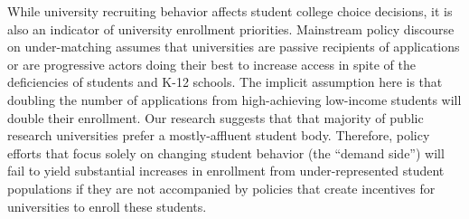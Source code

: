 \documentclass[twoside]{article}
\begin{document}

While university recruiting behavior affects student college choice decisions, it is also an indicator of university enrollment priorities.  Mainstream policy discourse on under-matching assumes that universities are passive recipients of applications or are progressive actors doing their best to increase access in spite of the deficiencies of students and K-12 schools.  The implicit assumption here is that doubling the number of applications from high-achieving low-income students will double their enrollment. Our research suggests that that majority of public research universities prefer a mostly-affluent student body. Therefore, policy efforts that focus solely on changing student behavior (the ``demand side'') will fail to yield substantial increases in enrollment from under-represented student populations if they are not accompanied by policies that create incentives for universities to enroll these students.
\end{document}
